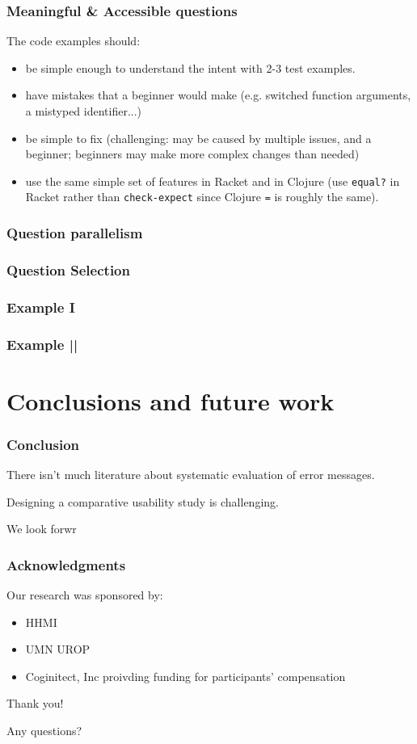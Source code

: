 \documentclass{beamer}
\begin{document}
\begin{frame}
	\frametitle{Meaningful \& Accessible questions}
The code examples should: 
	\begin{itemize}
		\item be simple enough to understand the intent with 2-3 test examples. 
		\item have mistakes that a beginner would make (e.g. switched function arguments, a mistyped identifier...) 
		\item be simple to fix (challenging: may  be caused by multiple issues, and a beginner; beginners may make more complex changes than needed)
		\item use the same simple set of features in Racket and in Clojure (use \texttt{equal?} in Racket rather than \texttt{check-expect} since Clojure {\tt =} is roughly the same). 
	\end{itemize}
\end{frame}

\begin{frame}
\frametitle{Question parallelism}
\end{frame}


\begin{frame}
\frametitle{Question Selection}
\end{frame}


\begin{frame}
\frametitle{Example I}
\end{frame}

\begin{frame}
\frametitle{Example ||}
\end{frame}

\section{Conclusions and future work} 

\begin{frame}
\frametitle{Conclusion}
There isn't much literature about systematic evaluation of error messages.

Designing a comparative usability study is challenging.

We look forwr 

\end{frame}

\begin{frame}
\frametitle{Acknowledgments}
	Our research was sponsored by:
	\begin{itemize}
	\item HHMI
	\item UMN UROP
          \item Coginitect, Inc proivding funding for participants' compensation 
	\end{itemize}
	
	
	{\centering
	\noindent
	Thank you! \par
	Any questions? \par
	}
\end{frame}
\end{document}
